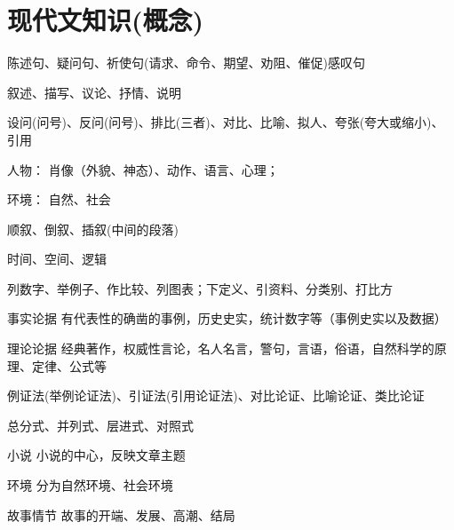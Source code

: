 \tableofcontents
\label{contents}
\newpage
{}

\section{现代文知识(概念)}

陈述句、疑问句、祈使句(请求、命令、期望、劝阻、催促)感叹句

叙述、描写、议论、抒情、说明

设问(问号)、反问(问号)、排比(三者)、对比、比喻、拟人、夸张(夸大或缩小)、引用

\begin{compactdesc}
\item[人物：]肖像（外貌、神态）、动作、语言、心理；
\item[环境：]自然、社会
\end{compactdesc}
顺叙、倒叙、插叙(中间的段落)

时间、空间、逻辑

列数字、举例子、作比较、列图表；下定义、引资料、分类别、打比方

\begin{compactdesc}
\item [事实论据]有代表性的确凿的事例，历史史实，统计数字等（事例史实以及数据）
\item [理论论据]经典著作，权威性言论，名人名言，警句，言语，俗语，自然科学的原理、定律、公式等
\end{compactdesc}

例证法(举例论证法)、引证法(引用论证法)、对比论证、比喻论证、类比论证

总分式、并列式、层进式、对照式

\begin{compactdesc}
\item[小说]小说的中心，反映文章主题
\item[环境]分为自然环境、社会环境
\item[故事情节]故事的开端、发展、高潮、结局
\end{compactdesc}

